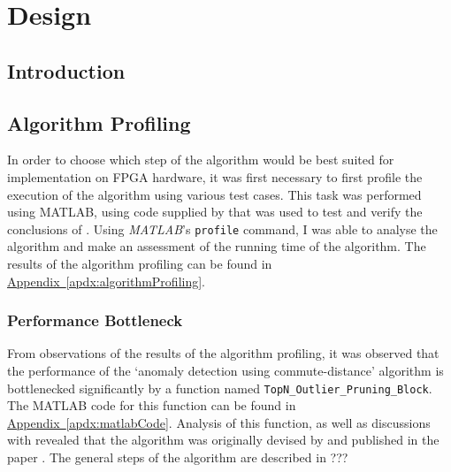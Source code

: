 \chapter{Design}
\label{ch:design}

\section{Introduction}
\label{sec:designIntroduction}

\section{Algorithm Profiling}
\label{sec:algorithmProfiling}
In order to choose which step of the algorithm would be best suited for 
implementation on FPGA hardware, it was first necessary to first profile the 
execution of the algorithm using various test cases. This task was performed 
using MATLAB, using code supplied by \citeauthor{Khoa:2012} that was used to 
test and verify the conclusions of . Using \emph{MATLAB}'s 
\verb+profile+ command, I was able to analyse the algorithm and make an 
assessment of the running time of the algorithm. The results of the algorithm 
profiling can be found in 
\hyperref[apdx:algorithmProfiling]{Appendix~\ref{apdx:algorithmProfiling}}. 

\subsection{Performance Bottleneck}
\label{sec:algorithmPerformanceBottleneck}
From observations of the results of the algorithm profiling, it was observed 
that the performance of the `anomaly detection using commute-distance' 
algorithm is bottlenecked significantly by a function named 
\verb+TopN_Outlier_Pruning_Block+. The MATLAB code for this function can be 
found in \hyperref[apdx:matlabCode]{Appendix~\ref{apdx:matlabCode}}. Analysis of
this function, as well as discussions with \citeauthor{Khoa:2012} revealed that
the algorithm was originally devised by \citeauthor{Bay:2003} and published in
the paper . The general steps of the algorithm are described
in ???


